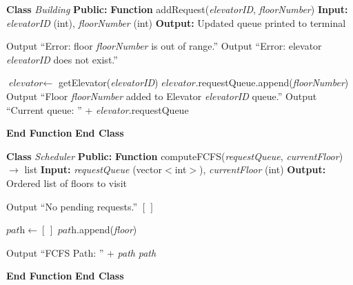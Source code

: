 \documentclass[a4paper,11pt]{article}
\begin{document}
\begin{algorithm}
\caption{Add Floor Request}
\begin{algorithmic}[1]

\State \textbf{Class} \textit{Building}
\State \hspace{0.5cm} \textbf{Public:}
\State \hspace{1cm} \textbf{Function} addRequest(\textit{elevatorID}, \textit{floorNumber})
\State \hspace{1.5cm} \textbf{Input:} \textit{elevatorID} (int), \textit{floorNumber} (int)
\State \hspace{1.5cm} \textbf{Output:} Updated queue printed to terminal

    \State Output ``Error: floor \textit{floorNumber} is out of range.''
    \State \Return
\EndIf
{}
    \State Output ``Error: elevator \textit{elevatorID} does not exist.''
    \State \Return
\EndIf

\State $\textit{elevator} \leftarrow$ getElevator(\textit{elevatorID})
\State $\textit{elevator}$.requestQueue.append(\textit{floorNumber})
\State Output ``Floor \textit{floorNumber} added to Elevator \textit{elevatorID} queue.''
\State Output ``Current queue: '' + \textit{elevator}.requestQueue

\State \hspace{1cm} \textbf{End Function}
\State \textbf{End Class}

\end{algorithmic}
\end{algorithm}

\begin{algorithm}
\caption{Calculate Path -- FCFS (First Come, First Served)}
\begin{algorithmic}[1]

\State \textbf{Class} \textit{Scheduler}
\State \hspace{0.5cm} \textbf{Public:}
\State \hspace{1cm} \textbf{Function} computeFCFS(\textit{requestQueue}, \textit{currentFloor}) $\rightarrow$ list
\State \hspace{1.5cm} \textbf{Input:} \textit{requestQueue} (vector$<$int$>$), \textit{currentFloor} (int)
\State \hspace{1.5cm} \textbf{Output:} Ordered list of floors to visit

    \State Output ``No pending requests.''
    \State \Return $[\,]$
\EndIf

\State $\textit{path} \leftarrow [\,]$
    \State $\textit{path}$.append(\textit{floor})
\EndFor

\State Output ``FCFS Path: '' + \textit{path}
\State \Return \textit{path}

\State \hspace{1cm} \textbf{End Function}
\State \textbf{End Class}

\end{algorithmic}
\end{algorithm}
\end{document}
